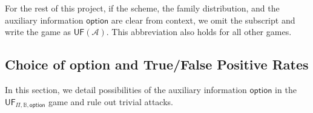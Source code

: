 For the rest of this project, if the scheme, the family distribution, and the auxiliary information $\textsf{option}$ are clear from context, we omit the subscript and write the game as $\textsf{UF}(\mathcal{A})$. This abbreviation also holds for all other games.




\subsection{Choice of \textsf{option} and True/False Positive Rates}
\label{sec:choice-of-option}

In this section, we detail possibilities of the auxiliary information $\textsf{option}$ in the $\textsf{UF}_{\Pi, \mathbb{B}, \textsf{option}}$ game and rule out trivial attacks.

